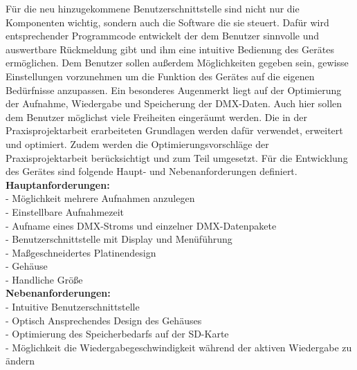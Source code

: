 Für die neu hinzugekommene Benutzerschnittstelle sind nicht nur die Komponenten wichtig, sondern auch die Software die sie steuert. Dafür wird entsprechender Programmcode entwickelt der dem Benutzer sinnvolle und auswertbare Rückmeldung gibt und ihm eine intuitive Bedienung des Gerätes ermöglichen. Dem Benutzer sollen außerdem Möglichkeiten gegeben sein, gewisse Einstellungen vorzunehmen um die Funktion des Gerätes auf die eigenen Bedürfnisse anzupassen. Ein besonderes Augenmerkt liegt auf der Optimierung der Aufnahme, Wiedergabe und Speicherung der DMX-Daten. Auch hier sollen dem Benutzer möglichst viele Freiheiten eingeräumt werden. Die in der Praxisprojektarbeit erarbeiteten Grundlagen werden dafür verwendet, erweitert und optimiert. Zudem werden die Optimierungsvorschläge der Praxisprojektarbeit berücksichtigt und zum Teil umgesetzt. Für die Entwicklung des Gerätes sind folgende Haupt- und Nebenanforderungen definiert.\\
\newline
\textbf{Hauptanforderungen:}\\
- Möglichkeit mehrere Aufnahmen anzulegen\\
- Einstellbare Aufnahmezeit\\
- Aufname eines DMX-Stroms und einzelner DMX-Datenpakete\\
- Benutzerschnittstelle mit Display und Menüführung\\
- Maßgeschneidertes Platinendesign\\
- Gehäuse\\
- Handliche Größe\\
\newline
\textbf{Nebenanforderungen:}\\
- Intuitive Benutzerschnittstelle\\
- Optisch Ansprechendes Design des Gehäuses\\
- Optimierung des Speicherbedarfs auf der SD-Karte\\
- Möglichkeit die Wiedergabegeschwindigkeit während der aktiven Wiedergabe zu ändern\\